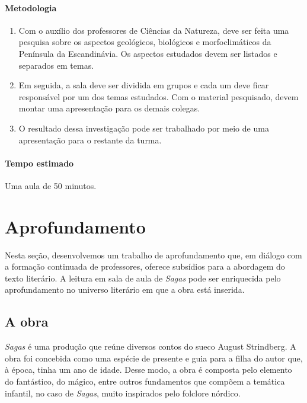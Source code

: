 \documentclass[12pt]{extarticle}
\begin{document}
\paragraph{Metodologia}

\begin{enumerate}

\item Com o auxílio dos professores de Ciências da Natureza,
deve ser feita uma pesquisa sobre os aspectos geológicos, biológicos e morfoclimáticos
da Península da Escandinávia. Os aspectos estudados devem ser listados
e separados em temas.

\item Em seguida, a sala deve ser dividida em grupos e cada um deve ficar
responsável por um dos temas estudados. Com o material pesquisado,
devem montar uma apresentação para os demais colegas.

\item O resultado dessa investigação pode ser trabalhado por meio de 
uma apresentação para o restante da turma.

\end{enumerate}

\paragraph{Tempo estimado} Uma aula de 50 minutos.


\section{Aprofundamento}

Nesta seção, desenvolvemos um trabalho de aprofundamento que, em diálogo
com a formação continuada de professores, oferece subsídios para a
abordagem do texto literário. A leitura em sala de aula de \emph{Sagas}
pode ser enriquecida pelo aprofundamento no universo literário em que a
obra está inserida.

\subsection{A obra}

\emph{Sagas} é uma produção que reúne diversos contos do sueco August
Strindberg. A obra foi concebida como uma espécie de presente e guia
para a filha do autor que, à época, tinha um ano de idade. Desse modo, a
obra é composta pelo elemento do fantástico, do mágico, entre outros
fundamentos que compõem a temática infantil, no caso de \emph{Sagas}, muito
inspirados pelo folclore nórdico.
\end{document}
